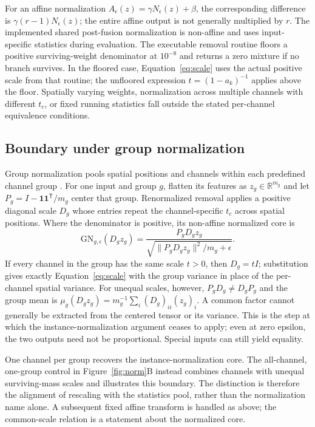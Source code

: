 \documentclass[mathematics,article,submit,pdftex,moreauthors]{Definitions/mdpi}
\begin{document}
For an affine normalization $A_\epsilon(z)=\gamma N_\epsilon(z)+\beta$,
the corresponding difference is
$\gamma(r-1)N_\epsilon(z)$; the entire affine output is not generally
multiplied by $r$. The implemented shared post-fusion normalization is
non-affine and uses input-specific statistics during evaluation.
The executable removal routine floors a positive surviving-weight denominator
at $10^{-8}$ and returns a zero mixture if no branch survives. In the floored
case, Equation~\eqref{eq:scale} uses the actual positive scale from that
routine; the unfloored expression $t=(1-a_k)^{-1}$ applies above the floor.
Spatially varying weights, normalization across multiple channels with
different $t_c$, or fixed running statistics fall outside the stated
per-channel equivalence conditions.

\subsection{Boundary under group normalization}\label{subsec:groupnorm}
Group normalization pools spatial positions and channels within each
predefined channel group \cite{wu2018groupnorm}. For one input and group $g$,
flatten its features as $z_g\in\mathbb{R}^{m_g}$ and let
$P_g=I-\mathbf{1}\mathbf{1}^{\mathsf T}/m_g$ center that group.
Renormalized removal applies a positive diagonal scale $D_g$ whose entries
repeat the channel-specific $t_c$ across spatial positions. Where the
denominator is positive, its non-affine normalized core is
\begin{equation}\label{eq:gnscale}
 \mathrm{GN}_{g,\epsilon}(D_gz_g)=
 \frac{P_gD_gz_g}{\sqrt{\|P_gD_gz_g\|^2/m_g+\epsilon}}.
\end{equation}
If every channel in the group has the same scale $t>0$, then $D_g=tI$;
substitution gives exactly Equation~\eqref{eq:scale} with the group variance
in place of the per-channel spatial variance. For unequal scales, however,
$P_gD_g\ne D_gP_g$ and the group mean is
$\mu_g(D_gz_g)=m_g^{-1}\sum_i(D_g)_{ii}(z_g)_i$.
A common factor cannot generally be extracted from the centered tensor or
its variance. This is the step at which the instance-normalization argument
ceases to apply; even at zero epsilon, the two outputs need not be proportional.
Special inputs can still yield equality.

One channel per group recovers the instance-normalization core. The
all-channel, one-group control in Figure~\ref{fig:norm}B instead combines
channels with unequal surviving-mass scales and illustrates this boundary.
The distinction is therefore the alignment of rescaling with the statistics
pool, rather than the normalization name alone. A subsequent fixed affine
transform is handled as above; the common-scale relation is a statement
about the normalized core.
\end{document}
